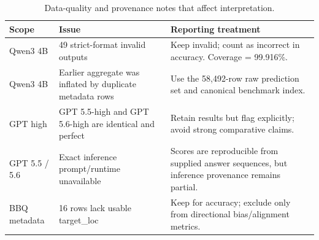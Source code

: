 \begin{table}[H]
\centering
\caption{Data-quality and provenance notes that affect interpretation.}
\label{tab:data-quality}
\small
\begin{tabularx}{\textwidth}{p{} X X}
\toprule
Scope & Issue & Reporting treatment \\
\midrule
Qwen3 4B & 49 strict-format invalid outputs & Keep invalid; count as incorrect in accuracy. Coverage = 99.916\%. \\
Qwen3 4B & Earlier aggregate was inflated by duplicate metadata rows & Use the 58,492-row raw prediction set and canonical benchmark index. \\
GPT high & GPT 5.5-high and GPT 5.6-high are identical and perfect & Retain results but flag explicitly; avoid strong comparative claims. \\
GPT 5.5 / 5.6 & Exact inference prompt/runtime unavailable & Scores are reproducible from supplied answer sequences, but inference provenance remains partial. \\
BBQ metadata & 16 rows lack usable target\_loc & Keep for accuracy; exclude only from directional bias/alignment metrics. \\
\bottomrule
\end{tabularx}
\end{table}